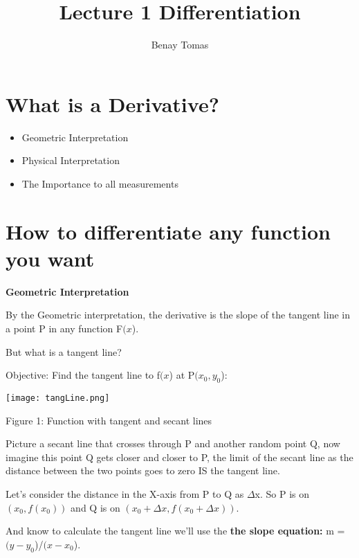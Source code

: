 \documentclass{article}
\title{Lecture 1 Differentiation}
\author{Benay Tomas}
\begin{document}
\maketitle

\indent
\section{What is a Derivative?}

{\Large
\begin{itemize}
    \item Geometric Interpretation
    \item Physical Interpretation
    \item The Importance to all measurements
\end{itemize}
}

\section{How to differentiate any function you want}

\vspace{0.25cm}
\Large
\textbf{Geometric Interpretation}

\vspace{0.5cm}
By the Geometric interpretation, the derivative is
the slope of the tangent line in a point P in any function F$(x$).

But what is a tangent line?

Objective: Find the tangent line to f$(x$) at P$(x_0,y_0$):

\vspace{1cm}
\begin{center}
\texttt{[image: tangLine.png]}

Figure 1: Function with tangent and secant lines
\end{center}

\vspace{1cm}

Picture a secant line that crosses through P and another
random point Q, now imagine this point Q gets closer and closer
to P, the limit of the secant line as the distance
between the two points goes to zero IS the tangent line.

\newpage

Let's consider the distance in the X-axis from P to Q as $\Delta$x.
So P is on $(x_0, f(x_0))$ and Q is on $(x_0+\Delta x, f(x_0+\Delta x))$.

And know to calculate the tangent line we'll use the \textbf{the slope equation:}
m = $(y-y_0$)/$(x-x_0$).
\end{document}
